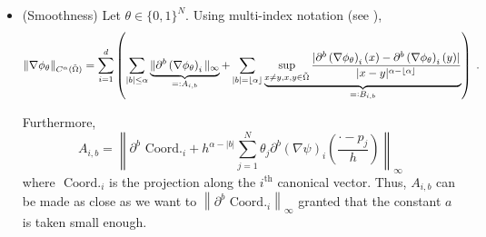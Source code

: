 \documentclass{article}
\theoremstyle{plain}
\theoremstyle{definition}
\theoremstyle{remark}
\newcommand{\defeq}{=\vcentcolon}
\newcommand\p[1]{\left( {#1}\right)}
\newcommand\floor[1]{\left\lfloor {#1}\right\rfloor}
\begin{document}
\begin{itemize}
    
    \item (Smoothness) Let $\theta \in \{0, 1 \}^{N}$. Using multi-index notation (see \cite{hutter2021minimax}),
    \begin{equation}
        \| \nabla \phi_{\theta} \|_{C^{\alpha}(\tilde{\Omega})}
        = 
        \sum_{i = 1}^d 
        \p{
        \sum_{|b| \leq \alpha} \underbrace{\| \partial^b \p{\nabla \phi_{\theta}}_i \|_{\infty}}_{\defeq A_{i, b}}
        + 
        \sum_{|b| = \floor{\alpha}}
        \underbrace{
        \sup_{x \neq y, x, y \in \tilde{\Omega}}
        \frac{|\partial^b \p{\nabla \phi_{\theta}}_i(x) - \partial^b \p{\nabla \phi_{\theta}}_i(y) |}{|x - y|^{\alpha - \floor{\alpha}}}}_{\defeq B_{i, b}}
        } \;.
    \end{equation}

    Furthermore, 
    \begin{equation}
        A_{i, b} = \left\|\partial^b \text{ Coord.}_i + h^{\alpha - |b|} \sum_{j = 1}^{N} \theta_j \partial^b (\nabla \psi)_i \p{\frac{\cdot - p_j}{h}}\right\|_{\infty}
    \end{equation}
    where $\text{ Coord.}_i$ is the projection along the $i^{\text{th}}$ canonical vector.
    Thus, $A_{i, b}$ can be made as close as we want to $\left\|\partial^b \text{ Coord.}_i\right\|_{\infty}$ granted that the constant $a$ is taken small enough.


\end{itemize}
\end{document}
